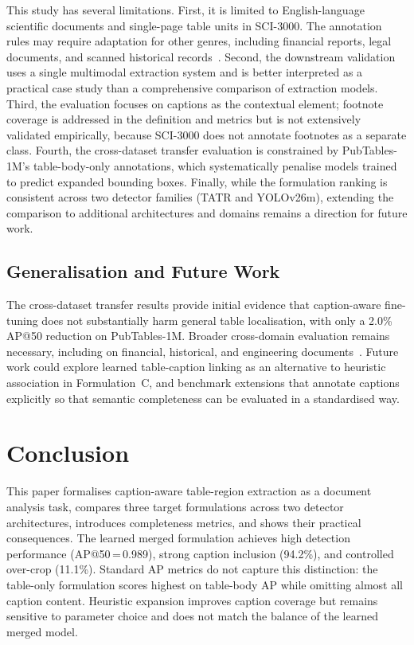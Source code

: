\documentclass[pdflatex,sn-mathphys-num,iicol]{sn-jnl}
\begin{document}
This study has several limitations. First, it is limited to English-language
scientific documents and single-page table units in SCI-3000. The annotation rules
may require adaptation for other genres, including financial reports, legal
documents, and scanned historical records~\cite{granell2023historical,andres2025pares}.
Second, the downstream validation uses a single multimodal extraction system and is
better interpreted as a practical case study than a comprehensive comparison of
extraction models. Third, the evaluation focuses on captions as the contextual
element; footnote coverage is addressed in the definition and metrics but is not
extensively validated empirically, because SCI-3000 does not annotate footnotes as a
separate class. Fourth, the cross-dataset transfer evaluation is constrained by
PubTables-1M's table-body-only annotations, which systematically penalise models
trained to predict expanded bounding boxes. Finally, while the formulation ranking
is consistent across two detector families (TATR and YOLOv26m), extending the
comparison to additional architectures and domains remains a direction for future
work.

\subsection{Generalisation and Future Work}\label{sec:future}

The cross-dataset transfer results provide initial evidence that caption-aware
fine-tuning does not substantially harm general table localisation, with only a
2.0\% AP@50 reduction on PubTables-1M. Broader cross-domain evaluation remains
necessary, including on financial, historical, and engineering
documents~\cite{zhang2022yolotable,song2024robust}. Future work could explore
learned table-caption linking as an alternative to heuristic association in
Formulation~C, and benchmark extensions that annotate captions explicitly so that
semantic completeness can be evaluated in a standardised way.

\section{Conclusion}\label{sec:conclusion}

This paper formalises caption-aware table-region extraction as a document analysis
task, compares three target formulations across two detector architectures,
introduces completeness metrics, and shows their practical consequences. The learned
merged formulation achieves high detection performance (AP@50\,=\,0.989), strong
caption inclusion (94.2\%), and controlled over-crop (11.1\%). Standard AP metrics
do not capture this distinction: the table-only formulation scores highest on
table-body AP while omitting almost all caption content. Heuristic expansion
improves caption coverage but remains sensitive to parameter choice and does not
match the balance of the learned merged model.
\end{document}
